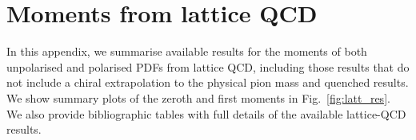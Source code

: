\section{Moments from lattice QCD}
\label{sec:LQCDtables}

In this appendix, we summarise available results for the moments of both 
unpolarised and polarised PDFs from lattice QCD, including those results 
that do not include a chiral extrapolation to the physical pion mass and 
quenched results. 
%
We show summary plots of the zeroth and first moments in 
Fig.~\ref{fig:latt_res}. 
%
We also provide bibliographic tables with full
details of the available lattice-QCD results.

\begin{table}
\renewcommand{\arraystretch}{1.2} 
\centering %
\end{table}
